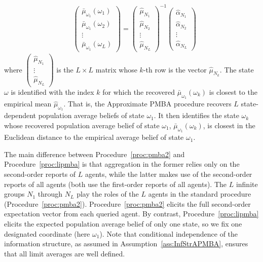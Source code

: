 \documentclass[12pt,reqno]{amsart}
\begin{document}
\begin{framedbox}[htbp]
\begin{minipage}{0.95\textwidth}
\begin{enumerate}
    \begin{align}
 &  \left( \begin{array}{c} \bar{\mu}_{\omega_1}(\omega_1)\\ \bar{\mu}_{\omega_1}(\omega_2) \\ \vdots\\ \bar{\mu}_{\omega_1}(\omega_L)\end{array}\right)  = \left( \begin{array}{c} \hat{\mu}_{N_1}\\ \hat{\mu}_{N_2} \\ \vdots\\ \hat{\mu}_{N_L}\end{array}\right)^{-1} 
    \left( \begin{array}{c} \hat{\alpha}_{N_1} \\ \hat{\alpha}_{N_2} \\ \vdots\\ \hat{\alpha}_{N_L}
    \end{array}     \right) \label{eqn:mainstep4}
    \end{align}
    where $\left(\begin{smallmatrix}\hat{\mu}_{N_1}\\ \vdots\\ \hat{\mu}_{N_L}\end{smallmatrix}\right)$ is the $L\times L$ matrix whose $k$-th row is the vector $\hat{\mu}_{N_k}$.
    The state $\omega$ is identified with the index $k$ for which the recovered $\bar{\mu}_{\omega_1}(\omega_k)$ is closest to the empirical mean $\hat{\mu}_{\omega_1}$. That is, the Approximate PMBA procedure recovers $L$ state-dependent population average beliefs of state $\omega_1$. It then identifies the state $\omega_k$ whose recovered population average belief of state $\omega_1$, $\bar{\mu}_{\omega_1}(\omega_k)$, is closest in the Euclidean distance to the empirical average belief of state $\omega_1$.
    \end{enumerate}
    \end{minipage}
    \end{framedbox}
The main difference between Procedure~\ref{proc:pmba2} and Procedure~\ref{proc:lipmba} is that aggregation in the former relies only on the second-order reports of $L$ agents, while the latter makes use of the second-order reports of all agents (both use the first-order reports of all agents). The $L$ infinite groups $N_1$ through $N_L$ play the roles of the $L$ agents in the standard procedure (Procedure~\ref{proc:pmba2}).
Procedure~\ref{proc:pmba2} elicits the full second-order expectation vector from each queried agent. By contrast, Procedure~\ref{proc:lipmba} elicits the expected population average belief of only one state, so we fix one designated coordinate (here $\omega_1$). Note that conditional independence of the information structure, as assumed in Assumption~\ref{ass:InfStrAPMBA}, ensures that all limit averages are well defined.
\end{document}
